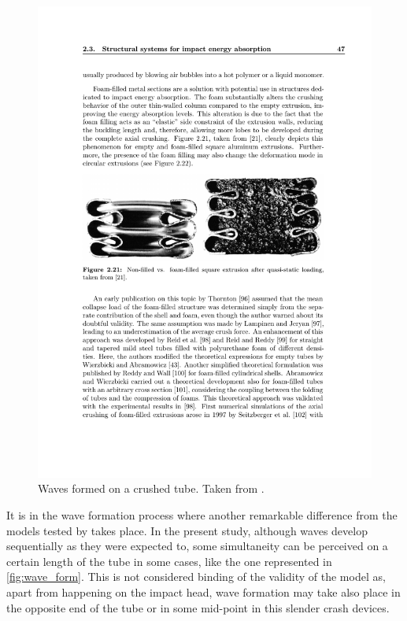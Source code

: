 \documentclass[
documentsize = a4, %
font = cmr, %
typesize = 11, %
printmode = true,
onehalfspacing = true,
language = en, %
titlepage = udciccp, %
degree = pt, %
dedication = true,
acknowledgements = true,
abstract-en = true,
abstract-es = false,
abstract-ga = false,
epigraphs = true,
toc = true,
lof = true,
lot = true,
frontmatterintoc = false,
notation = false,
minimal = false,
]{UDCthesis}
\begin{document}
\begin{figure}
\centering
\includegraphics[width=0.7\linewidth]{./IMG_CUTRES/waves}
\caption[Waves formed on a crushed tube.]{Waves formed on a crushed tube. Taken from \citet{Langseth}.}
\label{fig:waves}
\end{figure}

It is in the wave formation process where another remarkable difference from the models tested by \citet{Scattina2011} takes place. In the present study, although waves develop sequentially as they were expected to, some simultaneity can be perceived on a certain length of the tube in some cases, like the one represented in \cref{fig:wave_form}. This is not considered binding of the validity of the model as, apart from happening on the impact head, wave formation may take also place in the opposite end of the tube or in some mid-point \citep{Abedrabbo2009, Costas2013} in this slender crash devices.
\end{document}
